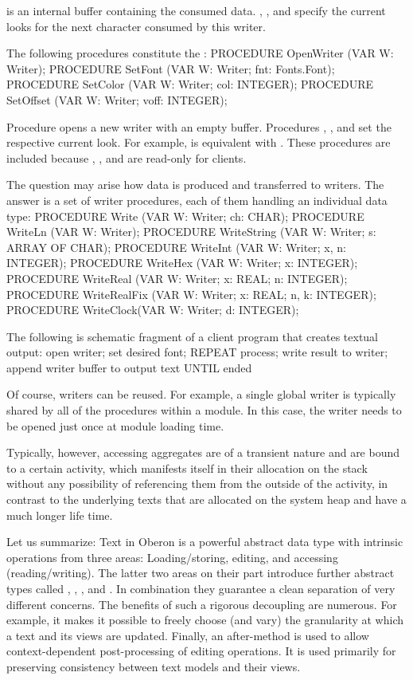 \noindent {} is an internal buffer containing the consumed data. , , and  specify the current looks for the next character consumed by this writer.

The following procedures constitute the  :
\begintt
PROCEDURE OpenWriter (VAR W: Writer);
PROCEDURE SetFont (VAR W: Writer; fnt: Fonts.Font);
PROCEDURE SetColor (VAR W: Writer; col: INTEGER);
PROCEDURE SetOffset (VAR W: Writer; voff: INTEGER);
\endtt

\noindent Procedure  opens a new writer with an empty buffer. Procedures , , and  set the respective current look. For example,
 is equivalent with .
These procedures are included because , , and  are read-only for clients.

The question may arise how data is produced and transferred to
writers. The answer is a set of writer procedures, each of them
handling an individual data type:
\begintt
PROCEDURE Write (VAR W: Writer; ch: CHAR);
PROCEDURE WriteLn (VAR W: Writer);
PROCEDURE WriteString (VAR W: Writer; s: ARRAY OF CHAR);
PROCEDURE WriteInt (VAR W: Writer; x, n: INTEGER);
PROCEDURE WriteHex (VAR W: Writer; x: INTEGER);
PROCEDURE WriteReal (VAR W: Writer; x: REAL; n: INTEGER);
PROCEDURE WriteRealFix (VAR W: Writer; x: REAL; n, k: INTEGER);
PROCEDURE WriteClock(VAR W: Writer; d: INTEGER);
\endtt

\noindent The following is schematic fragment of a client program that creates textual output:
\begintt
open writer; set desired font;
REPEAT
  process;
  write result to writer;
  append writer buffer to output text
UNTIL ended
\endtt

\noindent Of course, writers can be reused. For example, a single global writer
is typically shared by all of the procedures within a module. In this
case, the writer needs to be opened just once at module loading time.

Typically, however, accessing aggregates are of a transient nature and
are bound to a certain activity, which manifests itself in their
allocation on the stack without any possibility of referencing them
from the outside of the activity, in contrast to the underlying texts
that are allocated on the system heap and have a much longer life
time.

Let us summarize: Text in Oberon is a powerful abstract data type with
intrinsic operations from three areas: Loading/storing, editing, and
accessing (reading/writing). The latter two areas on their part
introduce further abstract types called , , , and
. In combination they guarantee a clean separation of very
different concerns. The benefits of such a rigorous decoupling are
numerous. For example, it makes it possible to freely choose (and
vary) the granularity at which a text and its views are
updated. Finally, an after-method is used to allow context-dependent
post-processing of editing operations. It is used primarily for
preserving consistency between text models and their views.

